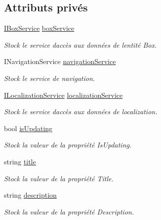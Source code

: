 \subsection*{Attributs privés}
\begin{DoxyCompactItemize}
\item 
\hyperlink{interface_boxes_1_1_services_1_1_box_1_1_i_box_service}{I\+Box\+Service} \hyperlink{class_boxes_1_1_view_models_1_1_edit_box_view_model_a35bb4b67f667937380b5beed177b6ae8}{box\+Service}
\begin{DoxyCompactList}\small\item\em Stock le service d\textquotesingle{}accès aux données de l\textquotesingle{}entité Box. \end{DoxyCompactList}\item 
I\+Navigation\+Service \hyperlink{class_boxes_1_1_view_models_1_1_edit_box_view_model_a5af96228bc2a2bebdd4372862829c46d}{navigation\+Service}
\begin{DoxyCompactList}\small\item\em Stock le service de navigation. \end{DoxyCompactList}\item 
\hyperlink{interface_boxes_1_1_services_1_1_localization_1_1_i_localization_service}{I\+Localization\+Service} \hyperlink{class_boxes_1_1_view_models_1_1_edit_box_view_model_afe7557739bc131aa155ccd6812df37c4}{localization\+Service}
\begin{DoxyCompactList}\small\item\em Stock le service d\textquotesingle{}accès aux données de localization. \end{DoxyCompactList}\item 
bool \hyperlink{class_boxes_1_1_view_models_1_1_edit_box_view_model_a4c9a3ff1136d89cb873a0af3dd77a25a}{is\+Updating}
\begin{DoxyCompactList}\small\item\em Stock la valeur de la propriété {\ttfamily Is\+Updating}. \end{DoxyCompactList}\item 
string \hyperlink{class_boxes_1_1_view_models_1_1_edit_box_view_model_a1726155b5f3c90391303fe6842745f2b}{title}
\begin{DoxyCompactList}\small\item\em Stock la valeur de la propriété {\ttfamily Title}. \end{DoxyCompactList}\item 
string \hyperlink{class_boxes_1_1_view_models_1_1_edit_box_view_model_a6f5f86d4704d201e886e8a92dd897889}{description}
\begin{DoxyCompactList}\small\item\em Stock la valeur de la propriété {\ttfamily Description}. \end{DoxyCompactList}\end{DoxyCompactItemize}


